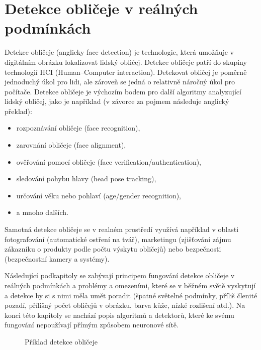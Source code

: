 \chapter{Detekce obličeje v reálných podmínkách}
\label{kapitola:detekce_obličeje}
Detekce obličeje (anglicky face detection) \cite{fdReview, frReview} je technologie, která umožňuje v digitálním obrázku lokalizovat lidský obličej. Detekce obličeje patří do skupiny technologií HCI (Human--Computer interaction).
Detekovat obličej je poměrně jednoduchý úkol pro lidi, ale zároveň se jedná o relativně náročný úkol pro počítače.
Detekce obličeje je výchozím bodem pro další algoritmy analyzující lidský obličej, jako je například (v závorce za pojmem následuje anglický překlad):
\begin{itemize}
  \item rozpoznávání obličeje (face recognition),
  \item zarovnání obličeje (face alignment),
  \item ověřování pomocí obličeje (face verification/authentication),
  \item sledování pohybu hlavy (head pose tracking),
  \item určování věku nebo pohlaví (age/gender recognition),
  \item[] a mnoho dalších. 
\end{itemize}

Samotná detekce obličeje se v realném prostředí využívá například v oblasti fotografování (automatické ostření na tvář), marketingu (zjišťování zájmu zákazníku o produkty podle počtu výskytu obličejů) nebo bezpečnosti (bezpečnostní kamery a systémy).

Následující podkapitoly se zabývají principem fungování detekce obličeje v reálných podmínkách a problémy a omezeními, které se v běžném světě vyskytují a detekce by si s nimi měla umět poradit (špatné světelné podmínky, příliš členité pozadí, přílišný počet obličejů v obrázku, barva kůže, nízké rozlišení atd.). Na konci této kapitoly se nachází popis algoritmů a detektorů, které ke svému fungování nepoužívají přímým způsobem neuronové sítě.

\begin{figure}[H]
  \begin{center}
  \label{fdexample}
  \caption{Příklad detekce obličeje}
  \end{center}
\end{figure}

